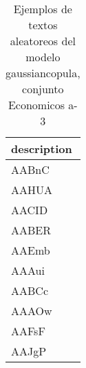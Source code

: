 \begin{table}[H]
\centering
\fontsize{8}{14}\selectfont
\caption{Ejemplos de textos aleatoreos del modelo gaussiancopula, conjunto Economicos a-3}
\label{table-sample10-economicos-a-3-gaussiancopula-text}
\begin{tabular}{|m{50em}|}
\hline
\rowcolor[gray]{0.8}
description \\
\hline AABnC \\
\hline AAHUA \\
\hline AACID \\
\hline AABER \\
\hline AAEmb \\
\hline AAAui \\
\hline AABCc \\
\hline AAAOw \\
\hline AAFsF \\
\hline AAJgP \\
\hline
\end{tabular}
\end{table}
